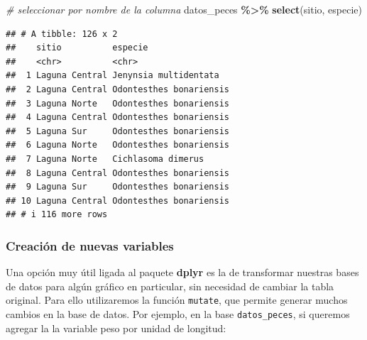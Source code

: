 \documentclass[
]{article}
\newenvironment{Shaded}{\begin{snugshade}}{\end{snugshade}}
\newcommand{\CommentTok}[1]{\textcolor[rgb]{0.56,0.35,0.01}{\textit{#1}}}
\newcommand{\FunctionTok}[1]{\textcolor[rgb]{0.13,0.29,0.53}{\textbf{#1}}}
\newcommand{\NormalTok}[1]{#1}
\newcommand{\OtherTok}[1]{\textcolor[rgb]{0.56,0.35,0.01}{#1}}
\newcommand{\SpecialCharTok}[1]{\textcolor[rgb]{0.81,0.36,0.00}{\textbf{#1}}}
\newcommand{\StringTok}[1]{\textcolor[rgb]{0.31,0.60,0.02}{#1}}
\begin{document}
\begin{Shaded}
\begin{Highlighting}[]
\CommentTok{\# seleccionar por nombre de la columna}
\NormalTok{datos\_peces }\SpecialCharTok{\%\textgreater{}\%} \FunctionTok{select}\NormalTok{(sitio, especie)}
\end{Highlighting}
\end{Shaded}

\begin{verbatim}
## # A tibble: 126 x 2
##    sitio          especie                
##    <chr>          <chr>                  
##  1 Laguna Central Jenynsia multidentata  
##  2 Laguna Central Odontesthes bonariensis
##  3 Laguna Norte   Odontesthes bonariensis
##  4 Laguna Central Odontesthes bonariensis
##  5 Laguna Sur     Odontesthes bonariensis
##  6 Laguna Norte   Odontesthes bonariensis
##  7 Laguna Norte   Cichlasoma dimerus     
##  8 Laguna Central Odontesthes bonariensis
##  9 Laguna Sur     Odontesthes bonariensis
## 10 Laguna Central Odontesthes bonariensis
## # i 116 more rows
\end{verbatim}

\subsubsection{Creación de nuevas
variables}\label{creaciuxf3n-de-nuevas-variables}

Una opción muy útil ligada al paquete \textbf{dplyr} es la de
transformar nuestras bases de datos para algún gráfico en particular,
sin necesidad de cambiar la tabla original. Para ello utilizaremos la
función \texttt{mutate}, que permite generar muchos cambios en la base
de datos. Por ejemplo, en la base \texttt{datos\_peces}, si queremos
agregar la la variable peso por unidad de longitud:

\begin{Shaded}
\end{Shaded}
\end{document}
